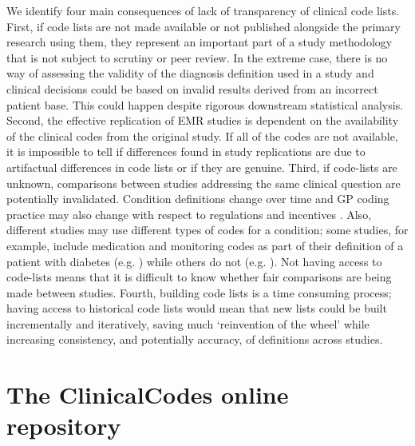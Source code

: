 \documentclass[10pt]{article}
\begin{document}
We identify four main consequences of lack of transparency of clinical code lists.  First, if code lists are not made available or not published alongside the primary research using them, they represent an important part of a study methodology that is not subject to scrutiny or peer review. In the extreme case, there is no way of assessing the validity of the diagnosis definition used in a study and clinical decisions could be based on invalid results derived from an incorrect patient base.  This could happen despite rigorous downstream statistical analysis.  Second, the effective replication of EMR studies is dependent on the availability of the clinical codes from the original study.  If all of the codes are not available, it is impossible to tell if differences found in study replications are due to artifactual differences in code lists or if they are genuine.  Third, if code-lists are unknown, comparisons between studies addressing the same clinical question are potentially invalidated.  Condition definitions change over time and GP coding practice may also change with respect to regulations and incentives \cite{Hippisley-Cox2006}. Also, different studies may use different types of codes for a condition; some studies, for example, include medication and monitoring codes as part of their definition of a patient with diabetes (e.g. \cite{Mulnier2006}) while others do not (e.g. \cite{Kontopantelis2014}).  Not having access to code-lists means that it is difficult to know whether fair comparisons are being made between studies. Fourth, building code lists is a time consuming process; having access to historical code lists  would mean that new lists could be built incrementally and iteratively, saving much `reinvention of the wheel' while increasing consistency, and potentially accuracy, of definitions across studies.



\section*{The ClinicalCodes online repository}
\end{document}
